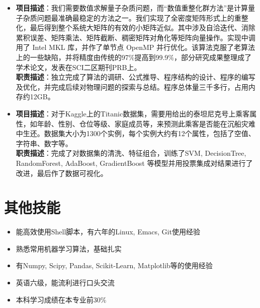 \documentclass{resume}
\begin{document}
\begin{itemize}
\item {}
{\textbf{项目描述}：我们需要数值求解量子杂质问题，而“数值重整化群方法”是计算量子杂质问题最准确最稳定的方法之一。我们实现了全密度矩阵形式上的重整化，最后得到整个系统大矩阵的有效的小矩阵近似。其中涉及自洽迭代、消除累积误差、矩阵乘法、矩阵截断、稠密矩阵对⻆化等矩阵向量操作。实现中调用了 Intel MKL 库，并作了单节点 OpenMP 并行优化。该算法克服了老算法上的一些缺陷，并将精度由传统的97\%提高到99.9\%，部分研究成果整理成了学术论文，发表在SCI二区期刊PRB上。}\\
\textbf{职责描述}：独立完成了算法的调研、公式推导、程序结构的设计、程序的编写及优化，并完成后续对物理问题的探索与总结。程序总体量三千多行，占用内存约12GB。
\item {}
\textbf{项目描述}：对于Kaggle上的Titanic数据集，需要用给出的泰坦尼克号上乘客属性，如年龄、性别、仓位等级、家庭成员等，来预测此乘客是否能在沉船灾难中生还。数据集大小为1300个实例，每个实例大约有12个属性，包括了空值、字符串、数字等。\\
\textbf{职责描述}：完成了对数据集的清洗、特征组合，训练了SVM, DecisionTree, RandomForest, AdaBoost, GradientBoost 等模型并用投票集成对结果进行了改进，最后作了数据可视化。
\end{itemize}

\section{其他技能}
\begin{itemize}%
\item 能高效使用Shell脚本，有六年的Linux, Emacs, Git使用经验
\item 熟悉常用机器学习算法，基础扎实
\item 有Numpy, Scipy, Pandas, Scikit-Learn, Matplotlib等的使用经验
\item 英语六级，能流利进行口头交流
\item 本科学习成绩在本专业前30\%
\end{itemize}
\end{document}
